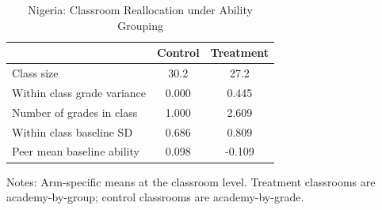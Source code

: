 \begin{table}[!htbp]
\centering
\caption{Nigeria: Classroom Reallocation under Ability Grouping}
\label{tab:ng_classroom_reallocation}
\begin{threeparttable}
\begin{tabular}[t]{lcc}
\toprule
 & Control & Treatment \\
\midrule
Class size &   30.2 &   27.2 \\
Within class grade variance &  0.000 &  0.445 \\
Number of grades in class &  1.000 &  2.609 \\
Within class baseline SD &  0.686 &  0.809 \\
Peer mean baseline ability &  0.098 & -0.109 \\
\bottomrule
\end{tabular}
\begin{tablenotes}[para]
\item Notes: Arm-specific means at the classroom level. Treatment classrooms are academy-by-group; control classrooms are academy-by-grade.
\end{tablenotes}
\end{threeparttable}
\end{table}
